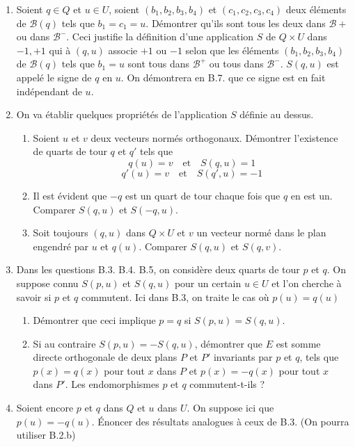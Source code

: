 \begin{enumerate}
\item Soient $q\in Q$ et $u\in U$, soient $(b_1,b_2,b_3,b_4)$ et $(c_1,c_2,c_3,c_4)$ deux éléments de $\mathcal{B}(q)$ tels que $b_1=c_1=u$. Démontrer qu'ils sont tous les deux dans $\mathcal{B}+$ ou dans $\mathcal{B}^-$.\newline
Ceci justifie la définition d'une application $S$ de $Q\times U$ dans ${-1,+1}$ qui à $(q,u)$ associe $+1$ ou $-1$ selon que les éléments $(b_1,b_2,b_3,b_4)$ de $\mathcal{B}(q)$ tels que $b_1=u$ sont tous dans $\mathcal{B}^+$ ou tous dans $\mathcal{B}^-$.\newline
$S(q,u)$ est appelé le signe de $q$ en $u$. On démontrera en B.7. que ce signe est en fait indépendant de $u$.
\item On va établir quelques propriétés de l'application $S$ définie au dessus.\begin{enumerate}
\item Soient $u$ et $v$ deux vecteurs normés orthogonaux. Démontrer l'existence de quarts de tour $q$ et $q'$ tels que
\[q(u)=v \quad \mathrm{et} \quad S(q,u)=1\]
\[q'(u)=v \quad \mathrm{et} \quad S(q',u)=-1\]
\item Il est évident que $-q$ est un quart de tour chaque fois que $q$ en est un. Comparer $S(q,u)$ et $S(-q,u)$.
\item Soit toujours $(q,u)$ dans $Q\times U$ et $v$ un vecteur normé dans le plan engendré par $u$ et $q(u)$. Comparer $S(q,u)$ et $S(q,v)$.
\end{enumerate}
\item Dans les questions B.3. B.4. B.5, on considère deux quarts de tour $p$ et $q$. On suppose connu $S(p,u)$ et $S(q,u)$ pour un certain $u\in U$ et l'on cherche à savoir si $p$ et $q$ commutent.\newline
Ici dans B.3, on traite le cas où $p(u)=q(u)$
\begin{enumerate}
\item Démontrer que ceci implique $p=q$ si $S(p,u)=S(q,u)$.
\item Si au contraire $S(p,u)=-S(q,u)$, démontrer que $E$ est somme directe orthogonale de deux plans $P$ et $P'$ invariants par $p$ et $q$, tels que $p(x)=q(x)$ pour tout $x$ dans $P$ et $p(x)=-q(x)$ pour tout $x$ dans $P'$. Les endomorphismes $p$ et $q$ commutent-t-ils ?
\end{enumerate}
\item Soient encore $p$ et $q$ dans $Q$ et $u$ dans $U$. On suppose ici que $p(u)=-q(u)$. {\'E}noncer des résultats analogues à ceux de B.3. (On pourra utiliser B.2.b)

\end{enumerate}
